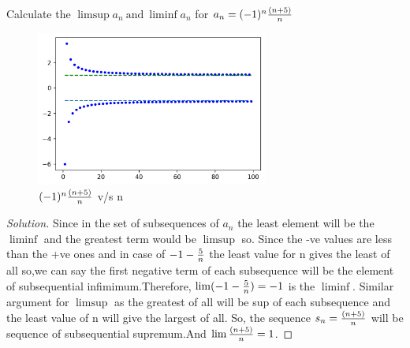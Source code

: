 \documentclass{notes}
\begin{document}
\paragraph{}
\begin{problem}
	Calculate the $\limsup a_n\ \text{and}\ \liminf a_n$ for $a_n = (-1)^n {(n+5) \over n}$ 
\end{problem}
\begin{figure}[h!]
	\hfill \includegraphics[height=2in,width=3in]{resources/lim_sup_prob.png} \hspace*{\fill}  %
	\caption{$(-1)^n {(n+5) \over n}$ v/s n}
\end{figure}
\begin{proof}[Solution]
	Since in the set of subsequences of $a_n$ the least element will be the $\liminf$ and the greatest term would be $\limsup$ so. Since the -ve values are less than the +ve ones and in case of $-1 - {5 \over n}$  the least value for n gives the least of all so,we can say the first negative term of each subsequence will be the element of subsequential infimimum.Therefore, $\lim (-1 - {5 \over n}) = -1$ is  the $\liminf$.
	Similar argument for $\limsup$ as the greatest of all will be sup of each subsequence and the least value of n will give the largest of all. So, the sequence $ s_n = {(n+5) \over n}$
	will be sequence of subsequential supremum.And $\lim {(n+5) \over n} = 1$.
\end{proof}
\end{document}
